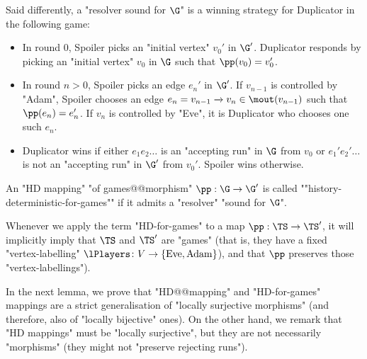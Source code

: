 \documentclass[10pt,a4paper]{amsart}
\newcommand{\re}[1]{\xrightarrow{#1}}
\newcommand{\Eve}{\mathrm{Eve}}
\newcommand{\Adam}{\mathrm{Adam}}
\begin{document}
Said differently, a "resolver sound for $\G$" is a winning strategy for Duplicator in the following game:
\begin{itemize}
	\item In round $0$, Spoiler picks an "initial vertex" $v_0'$ in $\G'$. Duplicator responds by picking an "initial vertex" $v_0$ in $\G$ such that $\pp(v_0) = v_0'$.
	\item In round $n>0$, Spoiler picks an edge $e_n'$ in $\G'$. If $v_{n-1}$ is controlled by "Adam", Spoiler chooses an edge $e_n = v_{n-1}\re{} v_{n}\in \mout(v_{n-1})$ such that $\pp(e_n) = e_n'$. If $v_n$ is controlled by "Eve", it is Duplicator who chooses one such $e_n$. 
	\item Duplicator wins if either $e_1e_2\dots$ is an "accepting run" in $\G $ from $v_0$ or $e_1'e_2'\dots$ is not an "accepting run" in $\G'$ from $v_0'$. Spoiler wins otherwise.
\end{itemize}

\begin{definition}\label{def:HD mapping-for-games}
	An "HD mapping" "of games@@morphism" $\pp:\G \to \G'$ is called ""history-deterministic-for-games"" if it admits a "resolver" "sound for $\G$".
\end{definition}

Whenever we apply the term "HD-for-games" to a map $\pp:\TS \to \TS'$, it will implicitly imply that $\TS$ and $\TS'$ are "games" (that is, they have a fixed "vertex-labelling" $\lPlayers\colon V\to \{\Eve, \Adam\}$), and that $\pp$ preserves those "vertex-labellings").



In the next lemma, we prove that "HD@@mapping" and "HD-for-games" mappings are a strict generalisation of "locally surjective morphisms" (and therefore, also of "locally bijective" ones). On the other hand, we remark that "HD mappings" must be "locally surjective", but they are not necessarily "morphisms" (they might not "preserve rejecting runs").
\end{document}
